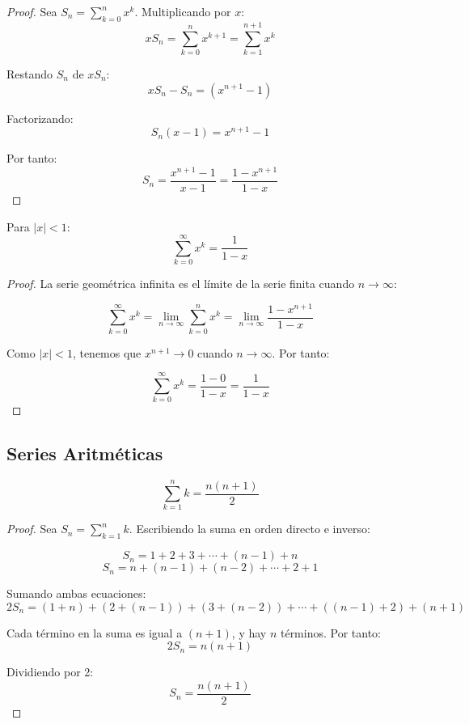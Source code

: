\begin{proof}
Sea $S_n = \sum_{k=0}^{n} x^k$. Multiplicando por $x$:
$$xS_n = \sum_{k=0}^{n} x^{k+1} = \sum_{k=1}^{n+1} x^k$$

Restando $S_n$ de $xS_n$:
$$xS_n - S_n = (x^{n+1} - 1)$$

Factorizando:
$$S_n(x - 1) = x^{n+1} - 1$$

Por tanto:
$$S_n = \frac{x^{n+1} - 1}{x - 1} = \frac{1 - x^{n+1}}{1 - x}$$
\end{proof}

\begin{teorema}
Para $|x| < 1$:
\begin{equation}
\sum_{k=0}^{\infty} x^k = \frac{1}{1 - x}
\end{equation}
\end{teorema}

\begin{proof}
La serie geométrica infinita es el límite de la serie finita cuando $n \to \infty$:

$$\sum_{k=0}^{\infty} x^k = \lim_{n \to \infty} \sum_{k=0}^{n} x^k = \lim_{n \to \infty} \frac{1 - x^{n+1}}{1 - x}$$

Como $|x| < 1$, tenemos que $x^{n+1} \to 0$ cuando $n \to \infty$. Por tanto:

$$\sum_{k=0}^{\infty} x^k = \frac{1 - 0}{1 - x} = \frac{1}{1 - x}$$
\end{proof}

\subsection{Series Aritméticas}

\begin{teorema}
\begin{equation}
\sum_{k=1}^{n} k = \frac{n(n+1)}{2}
\end{equation}
\end{teorema}

\begin{proof}
Sea $S_n = \sum_{k=1}^{n} k$. Escribiendo la suma en orden directo e inverso:

$$S_n = 1 + 2 + 3 + \cdots + (n-1) + n$$
$$S_n = n + (n-1) + (n-2) + \cdots + 2 + 1$$

Sumando ambas ecuaciones:
$$2S_n = (1+n) + (2+(n-1)) + (3+(n-2)) + \cdots + ((n-1)+2) + (n+1)$$

Cada término en la suma es igual a $(n+1)$, y hay $n$ términos. Por tanto:
$$2S_n = n(n+1)$$

Dividiendo por 2:
$$S_n = \frac{n(n+1)}{2}$$
\end{proof}

